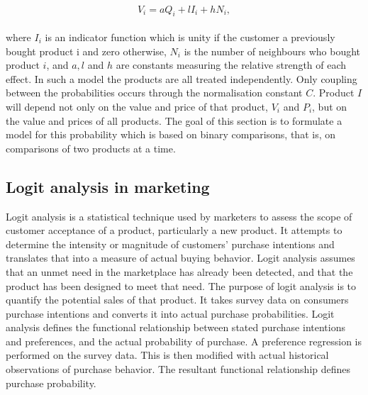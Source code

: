 \\
\begin{equation} \label{eq:9}
V_i = aQ_i + lI_i + hN_i,
\end{equation}
\\
where $I_i$ is an indicator function which is unity if the customer a previously bought product i and zero otherwise,
$N_i$ is the number of neighbours who bought product $i$, and $a, l$ and $h$ are constants measuring the relative strength
of each effect.
In such a model the products are all treated independently.
Only coupling between the probabilities occurs through the normalisation constant $C$.
Product $I$ will depend not only on the value and price of that product, $V_i$ and $P_i$, but on the value and prices of all products.
The goal of this section is to formulate a model for this probability which is based on binary comparisons, that is,
on comparisons of two products at a time.\\
\subsection{Logit analysis in marketing} \label{subsec:logit}
Logit analysis is a statistical technique used by marketers to assess the scope of customer acceptance of a product, particularly a new product.
It attempts to determine the intensity or magnitude of customers' purchase intentions and translates that into a measure of actual buying behavior.
Logit analysis assumes that an unmet need in the marketplace has already been detected, and that the product has been designed to meet that need.
The purpose of logit analysis is to quantify the potential sales of that product.
It takes survey data on consumers purchase intentions and converts it into actual purchase probabilities.
Logit analysis defines the functional relationship between stated purchase intentions and preferences, and the actual probability of purchase.
A preference regression is performed on the survey data.
This is then modified with actual historical observations of purchase behavior.
The resultant functional relationship defines purchase probability.

